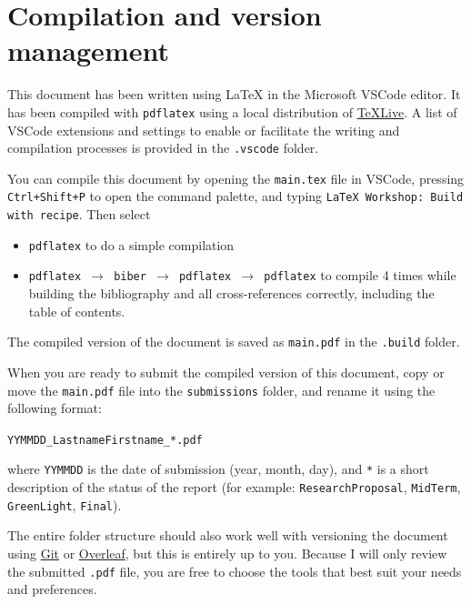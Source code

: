 \section{Compilation and version management}
\label{sec:compilation-versioning}

This document has been written using \LaTeX{} in the Microsoft VSCode editor.
It has been compiled with \texttt{pdflatex} using a local distribution of \href{https://www.tug.org/texlive/}{\TeX Live}.
A list of VSCode extensions and settings to enable or facilitate the writing and compilation processes is provided in the \texttt{.vscode} folder.


You can compile this document by opening the \texttt{main.tex} file in VSCode, pressing \texttt{Ctrl+Shift+P} to open the command palette, and typing \texttt{LaTeX Workshop: Build with recipe}.
Then select 
%
\begin{itemize}
    \item \texttt{pdflatex} to do a simple compilation
    \item \texttt{pdflatex $\rightarrow$ biber $\rightarrow$ pdflatex $\rightarrow$ pdflatex} to compile 4 times while building the bibliography and all cross-references correctly, including the table of contents.
\end{itemize}
%
The compiled version of the document is saved as \texttt{main.pdf} in the \texttt{.build} folder.


When you are ready to submit the compiled version of this document, copy or move the \texttt{main.pdf} file into the \texttt{submissions} folder, and rename it using the following format:
%
\begin{center}
    \texttt{YYMMDD\_LastnameFirstname\_*.pdf}
\end{center}
%
where \texttt{YYMMDD} is the date of submission (year, month, day), and \texttt{*} is a short description of the status of the report (for example: \texttt{ResearchProposal}, \texttt{MidTerm}, \texttt{GreenLight}, \texttt{Final}).


The entire folder structure should also work well with versioning the document using \href{https://git-scm.com/}{Git} or \href{https://www.overleaf.com/}{Overleaf}, but this is entirely up to you.
Because I will only review the submitted \texttt{.pdf} file, you are free to choose the tools that best suit your needs and preferences.







